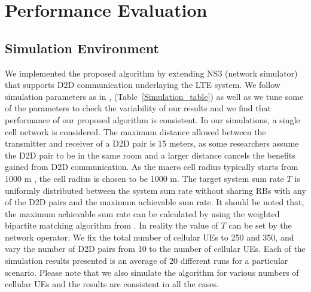 \documentclass{ieeeaccess}
\begin{document}
\section{Performance Evaluation}\label{section:FairPerformance}

\subsection{Simulation Environment}\label{sec:simulationEnvironment}
\smallskip
 
We implemented the proposed algorithm by extending NS3 (network simulator) \cite{ns3} that supports D2D communication underlaying the LTE system. We follow simulation parameters as in \cite{islam2016radio}, \cite{islam2015reducing} (Table~\ref{Simulation_table}) as well as we tune some of the parameters to check the variability of our results and we find that performance of our proposed algorithm is consistent. In our simulations, a single cell network is considered. The maximum distance allowed between the transmitter and receiver of a D2D pair is 15 meters, as some researchers assume the D2D pair to be in the same room \cite{osseiran} and a larger distance cancels the benefits gained from D2D communication. As the macro cell radius typically starts from 1000 m \cite{fujitsu}, the cell radius is chosen to be 1000 m. The target system sum rate $T$ is uniformly distributed between the system sum rate without sharing RBs with any of the D2D pairs and the maximum achievable sum rate. It should be noted that, the maximum achievable sum rate can be calculated by using the weighted bipartite matching algorithm from \cite{ccnc}. In reality the value of $T$ can be set by the network operator. We fix the total number of cellular UEs to 250 and 350, and vary the number of D2D pairs from 10 to the number of cellular UEs. Each of the simulation results presented is an average of $20$ different runs for a particular scenario. Please note that we also simulate the algorithm for various numbers of cellular UEs and the results are consistent in all the cases.

 
\end{document}
